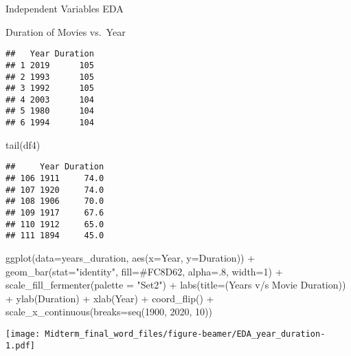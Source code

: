 \documentclass[
  ignorenonframetext,
]{beamer}
\newenvironment{Shaded}{\begin{snugshade}}{\end{snugshade}}
\newcommand{\AttributeTok}[1]{\textcolor[rgb]{0.77,0.63,0.00}{#1}}
\newcommand{\DecValTok}[1]{\textcolor[rgb]{0.00,0.00,0.81}{#1}}
\newcommand{\FunctionTok}[1]{\textcolor[rgb]{0.00,0.00,0.00}{#1}}
\newcommand{\NormalTok}[1]{#1}
\newcommand{\SpecialCharTok}[1]{\textcolor[rgb]{0.00,0.00,0.00}{#1}}
\newcommand{\StringTok}[1]{\textcolor[rgb]{0.31,0.60,0.02}{#1}}
\begin{document}
\begin{frame}[fragile]{Independent Variables EDA}
\begin{block}{Duration of Movies vs.~Year}
\begin{verbatim}
##   Year Duration
## 1 2019      105
## 2 1993      105
## 3 1992      105
## 4 2003      104
## 5 1980      104
## 6 1994      104
\end{verbatim}

\begin{Shaded}
\begin{Highlighting}[]
\FunctionTok{tail}\NormalTok{(df4)}
\end{Highlighting}
\end{Shaded}

\begin{verbatim}
##     Year Duration
## 106 1911     74.0
## 107 1920     74.0
## 108 1906     70.0
## 109 1917     67.6
## 110 1912     65.0
## 111 1894     45.0
\end{verbatim}

\begin{Shaded}
\begin{Highlighting}[]
\FunctionTok{ggplot}\NormalTok{(}\AttributeTok{data=}\NormalTok{years\_duration, }\FunctionTok{aes}\NormalTok{(}\AttributeTok{x=}\NormalTok{Year, }\AttributeTok{y=}\NormalTok{Duration)) }\SpecialCharTok{+}
  \FunctionTok{geom\_bar}\NormalTok{(}\AttributeTok{stat=}\StringTok{"identity"}\NormalTok{, }\AttributeTok{fill=}\StringTok{\textquotesingle{}\#FC8D62\textquotesingle{}}\NormalTok{, }\AttributeTok{alpha=}\NormalTok{.}\DecValTok{8}\NormalTok{, }\AttributeTok{width=}\DecValTok{1}\NormalTok{) }\SpecialCharTok{+}
    \FunctionTok{scale\_fill\_fermenter}\NormalTok{(}\AttributeTok{palette =} \StringTok{"Set2"}\NormalTok{) }\SpecialCharTok{+} 
      \FunctionTok{labs}\NormalTok{(}\AttributeTok{title=}\NormalTok{(}\StringTok{\textquotesingle{}Years v/s Movie Duration\textquotesingle{}}\NormalTok{)) }\SpecialCharTok{+} 
        \FunctionTok{ylab}\NormalTok{(}\StringTok{\textquotesingle{}Duration\textquotesingle{}}\NormalTok{) }\SpecialCharTok{+}
          \FunctionTok{xlab}\NormalTok{(}\StringTok{\textquotesingle{}Year\textquotesingle{}}\NormalTok{) }\SpecialCharTok{+}
            \FunctionTok{coord\_flip}\NormalTok{() }\SpecialCharTok{+}
              \FunctionTok{scale\_x\_continuous}\NormalTok{(}\AttributeTok{breaks=}\FunctionTok{seq}\NormalTok{(}\DecValTok{1900}\NormalTok{, }\DecValTok{2020}\NormalTok{, }\DecValTok{10}\NormalTok{))}
\end{Highlighting}
\end{Shaded}

\texttt{[image: Midterm\_final\_word\_files/figure-beamer/EDA\_year\_duration-1.pdf]}
\end{block}
\end{frame}
\end{document}
